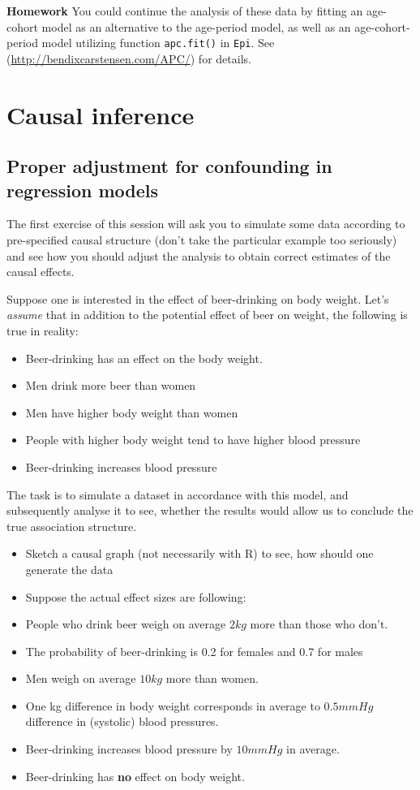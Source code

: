 \documentclass[
]{book}
\providecommand{\tightlist}{%
  \setlength{\itemsep}{0pt}\setlength{\parskip}{0pt}}
\begin{document}
\textbf{Homework}
You could continue the analysis of these data by fitting an age-cohort
model as an alternative to the age-period model, as well as an
age-cohort-period model utilizing function \texttt{apc.fit()} in
\texttt{Epi}. See (\url{http://bendixcarstensen.com/APC/}) for details.

\chapter{Causal inference}\label{causal-inference}

\section{Proper adjustment for confounding in regression models}\label{proper-adjustment-for-confounding-in-regression-models}

The first exercise of this session will ask you to simulate some data
according to pre-specified causal structure (don't take the particular
example too seriously) and see how you should adjust the analysis to
obtain correct estimates of the causal effects.

Suppose one is interested in the effect of beer-drinking on body weight.
Let's \emph{assume} that in addition to the potential effect of beer on weight, the following is true in reality:

\begin{itemize}
\tightlist
\item
  Beer-drinking has an effect on the body weight.
\item
  Men drink more beer than women
\item
  Men have higher body weight than women
\item
  People with higher body weight tend to have higher blood pressure
\item
  Beer-drinking increases blood pressure
\end{itemize}

The task is to simulate a dataset in accordance with this model, and
subsequently analyse it to see, whether the results would allow us to
conclude the true association structure.

\begin{itemize}
\item
  Sketch a causal graph (not necessarily with R) to see, how should one generate the data
\item
  Suppose the actual effect sizes are following:
\item
  People who drink beer weigh on average \(2kg\) more than those who don't.
\item
  The probability of beer-drinking is 0.2 for females and 0.7 for males
\item
  Men weigh on average \(10kg\) more than women.
\item
  One kg difference in body weight corresponds in
  average to \(0.5mmHg\) difference in (systolic) blood pressures.
\item
  Beer-drinking increases blood pressure by \(10mmHg\) in average.
\item
  Beer-drinking has \textbf{no} effect on body weight.
\end{itemize}
\end{document}
